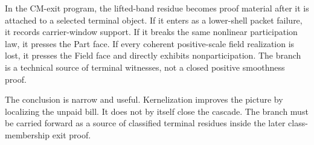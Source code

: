 In the CM-exit program, the lifted-band residue becomes proof material after it
is attached to a selected terminal object. If it enters as a lower-shell packet failure, it
records carrier-window support. If it breaks the same nonlinear participation
law, it presses the Part face. If every coherent positive-scale field
realization is lost, it presses the Field face and directly exhibits
nonparticipation. The branch is a technical source of
terminal witnesses, not a closed positive smoothness proof.

The conclusion is narrow and useful. Kernelization improves the picture by
localizing the unpaid bill. It does not by itself close the cascade. The branch
must be carried forward as a source of classified terminal residues inside the
later class-membership exit proof.
